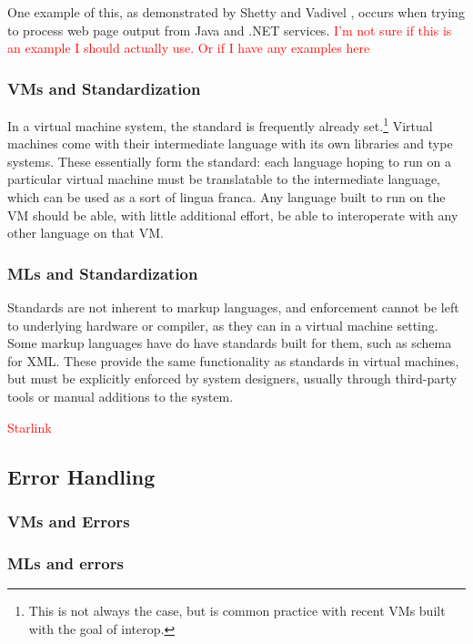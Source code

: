 \documentclass{sig-alternate}
\newcommand{\mycomment}[1]{\textcolor{red}{#1}}
\begin{document}
One example of this, as demonstrated by Shetty and Vadivel \cite{Shetty:2009}, occurs when trying to process web page output from Java and .NET services. \mycomment{I'm not sure if this is an example I should actually use. Or if I have any examples here}

\subsubsection*{VMs and Standardization}
In a virtual machine system, the standard is frequently already set.\footnote{This is not always the case, but is common practice with recent VMs built with the goal of interop.} Virtual machines come with their intermediate language with its own libraries and type systems. These essentially form the standard: each language hoping to run on a particular virtual machine must be translatable to the intermediate language, which can be used as a sort of lingua franca. Any language built to run on the VM should be able, with little additional effort, be able to interoperate with any other language on that VM.


\subsubsection*{MLs and Standardization}
Standards are not inherent to markup languages, and enforcement cannot be left to underlying hardware or compiler, as they can in a virtual machine setting. Some markup languages have do have standards built for them, such as schema for XML. These provide the same functionality as standards in virtual machines, but must be explicitly enforced by system designers, usually through third-party tools or manual additions to the system.
	
\mycomment{Starlink}



\subsection{Error Handling}\label{errors}

\subsubsection*{VMs and Errors}

\subsubsection*{MLs and errors}
\end{document}

